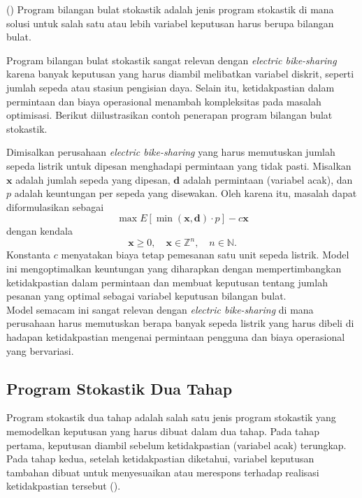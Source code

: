 \begin{definisi}()
    Program bilangan bulat stokastik adalah jenis program stokastik di mana solusi untuk salah satu atau lebih variabel keputusan harus berupa bilangan bulat.
\end{definisi}

Program bilangan bulat stokastik sangat relevan dengan \textit{electric bike-sharing} karena banyak keputusan yang harus diambil melibatkan variabel diskrit, seperti jumlah sepeda atau stasiun pengisian daya. Selain itu, ketidakpastian dalam permintaan dan biaya operasional menambah kompleksitas pada masalah optimisasi. Berikut diilustrasikan contoh penerapan program bilangan bulat stokastik.

\begin{contoh}
    Dimisalkan perusahaan \textit{electric bike-sharing} yang harus memutuskan jumlah sepeda listrik untuk dipesan menghadapi permintaan yang tidak pasti. Misalkan $\boldsymbol{x}$ adalah jumlah sepeda yang dipesan, $\boldsymbol{d}$ adalah permintaan (variabel acak), dan $p$ adalah keuntungan per sepeda yang disewakan. Oleh karena itu, masalah dapat diformulasikan sebagai
    $$
    \max E[\min(\boldsymbol{x}, \boldsymbol{d}) \cdot p] - c\boldsymbol{x}
    $$
    dengan kendala
    $$\boldsymbol{x} \geq 0, \quad \boldsymbol{x} \in \mathbb{Z}^n, \quad n \in \mathbb{N}.
    $$
    Konstanta $c$ menyatakan biaya tetap pemesanan satu unit sepeda listrik. Model ini mengoptimalkan keuntungan yang diharapkan dengan mempertimbangkan ketidakpastian dalam permintaan dan membuat keputusan tentang jumlah pesanan yang optimal sebagai variabel keputusan bilangan bulat.\\
    
    Model semacam ini sangat relevan dengan \textit{electric bike-sharing} di mana perusahaan harus memutuskan berapa banyak sepeda listrik yang harus dibeli di hadapan ketidakpastian mengenai permintaan pengguna dan biaya operasional yang bervariasi.
\end{contoh}

\subsection{Program Stokastik Dua Tahap}

Program stokastik dua tahap adalah salah satu jenis program stokastik yang memodelkan keputusan yang harus dibuat dalam dua tahap. Pada tahap pertama, keputusan diambil sebelum ketidakpastian (variabel acak) terungkap. Pada tahap kedua, setelah ketidakpastian diketahui, variabel keputusan tambahan dibuat untuk menyesuaikan atau merespons terhadap realisasi ketidakpastian tersebut ().

